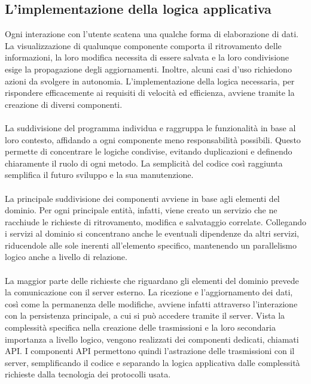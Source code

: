 \clearpage


\subsection{L'implementazione della logica applicativa}

Ogni interazione con l'utente scatena una qualche forma di elaborazione di dati. 
La visualizzazione di qualunque componente comporta il ritrovamento delle informazioni, 
la loro modifica necessita di essere salvata e la loro condivisione esige la propagazione degli aggiornamenti.
Inoltre, alcuni casi d'uso richiedono azioni da svolgere in autonomia.
L'implementazione della logica necessaria, 
per rispondere efficacemente ai requisiti di velocità ed efficienza,
avviene tramite la creazione di diversi componenti.\\
\\
La suddivisione del programma individua e raggruppa le funzionalità in base al loro contesto, 
affidando a ogni componente meno responsabilità possibili.
Questo permette di concentrare le logiche condivise, 
evitando duplicazioni e definendo chiaramente il ruolo di ogni metodo.
La semplicità del codice così raggiunta semplifica il futuro sviluppo e la sua manutenzione.\\
\\
La principale suddivisione dei componenti avviene in base agli elementi del dominio.
Per ogni principale entità, infatti, viene creato un servizio che ne racchiude
le richieste di ritrovamento, modifica e salvataggio correlate.
Collegando i servizi al dominio si concentrano anche le eventuali dipendenze da altri servizi, 
riducendole alle sole inerenti all'elemento specifico, 
mantenendo un parallelismo logico anche a livello di relazione.\\
\\
La maggior parte delle richieste che riguardano gli elementi del dominio prevede 
la comunicazione con il server esterno. 
La ricezione e l'aggiornamento dei dati, così come la permanenza delle modifiche, avviene infatti attraverso 
l'interazione con la persistenza principale, a cui si può accedere tramite il server.
Vista la complessità specifica nella creazione delle trasmissioni e 
la loro secondaria importanza a livello logico, 
vengono realizzati dei componenti dedicati, chiamati API.
I componenti API permettono quindi l'astrazione delle trasmissioni con il server, 
semplificando il codice e 
separando la logica applicativa dalle complessità richieste dalla tecnologia dei protocolli usata.

